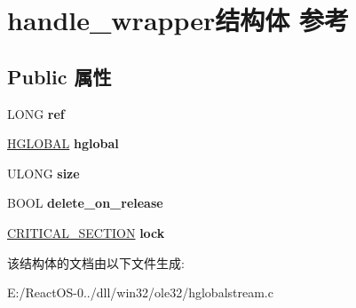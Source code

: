 \hypertarget{structhandle__wrapper}{}\section{handle\+\_\+wrapper结构体 参考}
\label{structhandle__wrapper}
\subsection*{Public 属性}
\begin{DoxyCompactItemize}
\item 
\mbox{\label{structhandle__wrapper_a6ccc09ee5d09e4ce51f2e73a133545db}} 
L\+O\+NG {\bfseries ref}
\item 
\mbox{\label{structhandle__wrapper_a415754745d7e204e847979b5ff159a01}} 
\hyperlink{interfacevoid}{H\+G\+L\+O\+B\+AL} {\bfseries hglobal}
\item 
\mbox{\label{structhandle__wrapper_a64a33f75a83d917ac5a121adca4ec301}} 
U\+L\+O\+NG {\bfseries size}
\item 
\mbox{\label{structhandle__wrapper_aeb8c84b65806ef99d7809e47c6360218}} 
B\+O\+OL {\bfseries delete\+\_\+on\+\_\+release}
\item 
\mbox{\label{structhandle__wrapper_a3aa4532446146224a6dd6e1fcfe8ba3a}} 
\hyperlink{struct___c_r_i_t_i_c_a_l___s_e_c_t_i_o_n}{C\+R\+I\+T\+I\+C\+A\+L\+\_\+\+S\+E\+C\+T\+I\+ON} {\bfseries lock}
\end{DoxyCompactItemize}


该结构体的文档由以下文件生成\+:\begin{DoxyCompactItemize}
\item 
E\+:/\+React\+O\+S-\/0../dll/win32/ole32/hglobalstream.\+c\end{DoxyCompactItemize}
